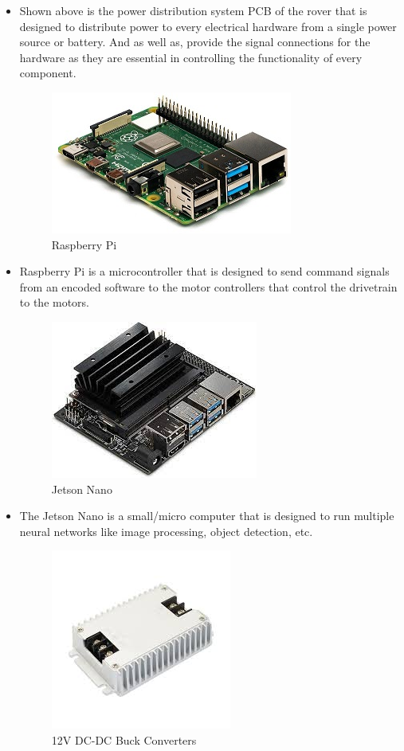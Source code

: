 \documentclass[a4paper, 10pt]{article}
\begin{document}
		\begin{itemize}
		\item Shown above is the power distribution system PCB of the rover that is designed to distribute power to every electrical hardware from a single power source or battery. And as well as, provide the signal connections for the hardware as they are essential in controlling the functionality of every component. 

		\begin{figure} [h]
			\centering
			\includegraphics[scale=0.5]{Photos/Raspberry Pi}
			\caption{Raspberry Pi}
		\end{figure}

		\item Raspberry Pi is a microcontroller that is designed to send command signals from an encoded software to the motor controllers that control the drivetrain to the motors.

		\begin{figure} [!h]
			\centering
			\includegraphics[scale=0.35]{Photos/Jetson Nano}
			\caption{Jetson Nano}
		\end{figure}

		\item The Jetson Nano is a small/micro computer that is designed to run multiple neural networks like image processing, object detection, etc. 

		\begin{figure} [!h]
			\centering
			\includegraphics[scale=0.25]{Photos/12V DC-DC buck converter}
			\caption{12V DC-DC Buck Converters}
		\end{figure}
		

\end{itemize}
\end{document}

